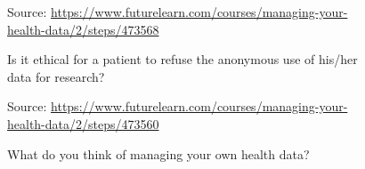 \documentclass[10pt, twoside]{article}   	%
\begin{document}
    \begin{figure}[H]
      \centering
            {\scriptsize%
            Source: \url{https://www.futurelearn.com/courses/managing-your-health-data/2/steps/473568}}
 \caption{Is it ethical for a patient to refuse the anonymous use of his/her data for research?}
 \end{figure}

    \begin{figure}[H]
      \centering
            {\scriptsize%
            Source: \url{https://www.futurelearn.com/courses/managing-your-health-data/2/steps/473560}}
 \caption{What do you think of managing your own health data?}
 \end{figure}
\end{document}
